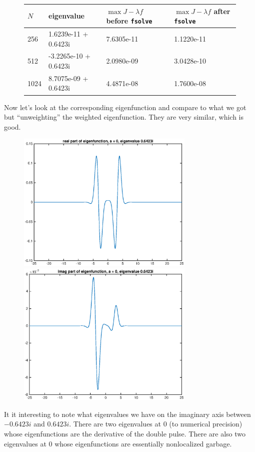 \documentclass[12pt]{article}
\begin{document}
\begin{figure}[H]
\begin{tabular}{l|lll}
  $N$   & eigenvalue &  $\max J -\lambda f$ before \texttt{fsolve}  &  $\max J -\lambda f$ after \texttt{fsolve} \\ \hline
  256   &  1.6239e-11 + 0.6423i  & 7.6305e-11   &    1.1220e-11  \\ 
  512   & -3.2265e-10 + 0.6423i  &  2.0980e-09  &   3.0428e-10  \\ 
  1024  &  8.7075e-09 + 0.6423i  &  4.4871e-08  &  1.7600e-08 \\
\end{tabular}
\end{figure}
Now let's look at the corresponding eigenfunction and compare to what we got but ``unweighting'' the weighted eigenfunction. They are very similar, which is good.
\begin{figure}[H]
\includegraphics[width=8.5cm]{1double2a0eigenfnreal}
\includegraphics[width=8.5cm]{1double2a0eigenfnimag}
\end{figure}
It it interesting to note what eigenvalues we have on the imaginary axis between $-0.6423i$ and $0.6423i$. There are two eigenvalues at 0 (to numerical precision) whose eigenfunctions are the derivative of the double pulse. There are also two eigenvalues at 0 whose eigenfunctions are essentially nonlocalized garbage.\\
\end{document}
